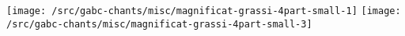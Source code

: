 \texttt{[image: /src/gabc-chants/misc/magnificat-grassi-4part-small-1]}%
\ifx\betweenLilyPondSystem \undefined
  \linebreak
\else
  \expandafter{}%
\fi
\texttt{[image: /src/gabc-chants/misc/magnificat-grassi-4part-small-3]}%
